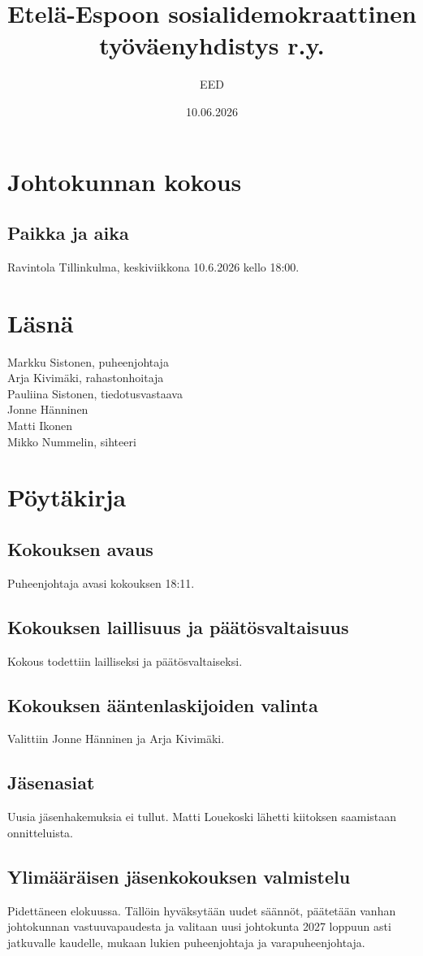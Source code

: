 \documentclass[a4paper,12pt]{article}
\title{Etelä-Espoon sosialidemokraattinen työväenyhdistys r.y.}
\author{EED}
\date{10.06.2026}
\begin{document}
\maketitle
\tableofcontents
\section*{Johtokunnan kokous}
\subsection*{Paikka ja aika}
Ravintola Tillinkulma, keskiviikkona 10.6.2026 kello 18:00.
\section*{Läsnä}
Markku Sistonen, puheenjohtaja \\
Arja Kivimäki, rahastonhoitaja \\
Pauliina Sistonen, tiedotusvastaava \\
Jonne Hänninen \\
Matti Ikonen \\
Mikko Nummelin, sihteeri
\section*{Pöytäkirja}
\subsection{Kokouksen avaus}
Puheenjohtaja avasi kokouksen 18:11.
\subsection{Kokouksen laillisuus ja päätösvaltaisuus}
Kokous todettiin lailliseksi ja päätösvaltaiseksi.
\subsection{Kokouksen ääntenlaskijoiden valinta}
Valittiin Jonne Hänninen ja Arja Kivimäki.
\subsection{Jäsenasiat}
Uusia jäsenhakemuksia ei tullut. Matti Louekoski lähetti kiitoksen saamistaan onnitteluista.
\subsection{Ylimääräisen jäsenkokouksen valmistelu}
Pidettäneen elokuussa. Tällöin hyväksytään uudet säännöt, päätetään vanhan johtokunnan vastuuvapaudesta ja valitaan uusi johtokunta 2027 loppuun asti jatkuvalle kaudelle, mukaan lukien puheenjohtaja ja varapuheenjohtaja.
\end{document}
